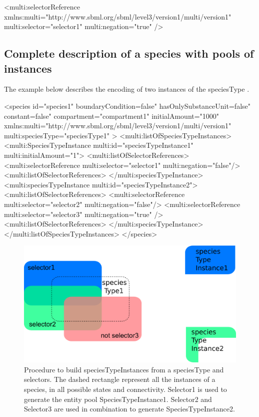 \begin{example}
<multi:selectorReference 
         xmlns:multi="http://www.sbml.org/sbml/level3/version1/multi/version1" 
         multi:selector="selector1"
         multi:negation="true" />
\end{example}

\subsection{Complete description of a species with pools of instances}\label{exampleSpecies}

The example below describes the encoding of two instances of the speciesType . 

\begin{example}
<species id="species1" 
         boundaryCondition=false" hasOnlySubstanceUnit=false" constant=false"
         compartment="compartment1" initialAmount="1000"
         xmlns:multi="http://www.sbml.org/sbml/level3/version1/multi/version1"
         multi:speciesType="speciesType1" >
  <multi:listOfSpeciesTypeInstances>
    <multi:SpeciesTypeInstance multi:id="speciesTypeInstance1" 
                               multi:initialAmount="1">
      <multi:listOfSelectorReferences>
        <multi:selectorReference multi:selector="selector1" multi:negation="false"/>
      <multi:listOfSelectorReferences>
    </multi:speciesTypeInstance>
    <multi:speciesTypeInstance multi:id="speciesTypeInstance2">
      <multi:listOfSelectorReferences>
        <multi:selectorReference multi:selector="selector2" multi:negation="false"/>
        <multi:selectorReference multi:selector="selector3" multi:negation="true" />
      <multi:listOfSelectorReferences>
    </multi:speciesTypeInstance>
  </multi:listOfSpeciesTypeInstances>
</species>
\end{example}

\begin{figure}[H]
\begin{center}
\includegraphics[scale=0.4]{figs/pngs/speciesTypeInstanceBuilding.png}
\caption{Procedure to build speciesTypeInstances from a speciesType and selectors. The dashed rectangle represent all the instances of a species, in all possible states and connectivity. Selector1 is used to generate the entity pool SpeciesTypeInstance1. Selector2 and Selector3 are used in combination to generate SpeciesTypeInstance2.}
\label{fig:speciesTypeInstanceBuilding}
\end{center}
\end{figure}


